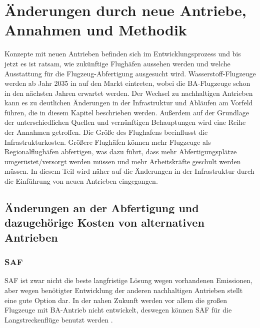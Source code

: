 \chapter{Änderungen durch neue Antriebe, Annahmen und Methodik}
\label{ch:Änderungen durch neue Antriebe, Annahmen und Methodik}

Konzepte mit neuen Antrieben befinden sich im Entwicklungsprozess und bis jetzt es ist ratsam, wie zukünftige Flughäfen aussehen werden
und welche Ausstattung für die Flugzeug-Abfertigung ausgesucht wird. Wasserstoff-Flugzeuge werden ab Jahr 2035 in 
auf den Markt eintreten, wobei die BA-Flugzeuge schon in den nächsten Jahren erwartet werden.
Der Wechsel zu nachhaltigen Antrieben kann es zu deutlichen Änderungen in der Infrastruktur und Abläufen am Vorfeld führen, die
in diesem Kapitel beschrieben werden.
Außerdem auf der Grundlage der unterschiedlichen Quellen und vernünftigen Behauptungen wird eine Reihe der Annahmen getroffen.
%
Die Größe des Flughafens beeinflusst die Infrastrukturkosten. Größere Flughäfen können mehr Flugzeuge als Regionalflughäfen 
abfertigen, was dazu führt, dass mehr Abfertigungsplätze umgerüstet/versorgt werden müssen und mehr Arbeitskräfte geschult werden müssen. 
In diesem Teil wird näher auf die Änderungen in der Infrastruktur durch die Einführung 
von neuen Antrieben eingegangen.

\section{Änderungen an der Abfertigung und dazugehörige Kosten von alternativen Antrieben}
\label{s:Änderungen an der Abfertigung und dazugehörige Kosten von alternativen Antrieben}

\subsection{SAF}
SAF ist zwar nicht die beste langfristige Lösung wegen vorhandenen Emissionen, aber wegen benötigter Entwicklung der anderen nachhaltigen
Antrieben stellt eine gute Option dar. In der nahen Zukunft werden vor allem die großen Flugzeuge mit BA-Antrieb nicht entwickelt, 
deswegen können SAF für die Langstreckenflüge benutzt werden \cite{dalmia2022powering}.

